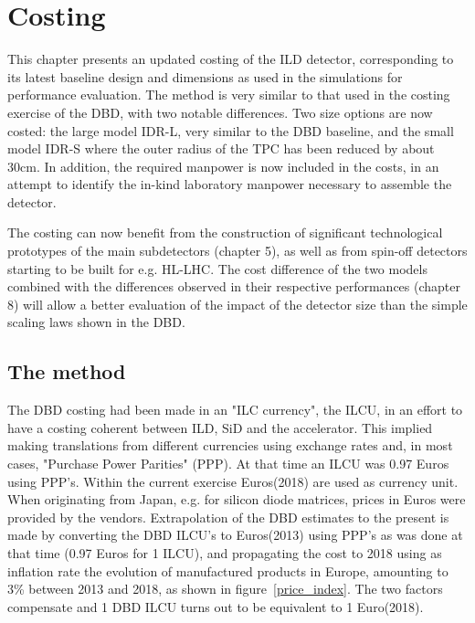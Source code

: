 \chapter{Costing}
\label{chap:costing}
This chapter presents an updated costing of the ILD detector, corresponding to its latest baseline design and dimensions as used in the simulations for performance evaluation. The method is very similar to that used in the costing exercise of the DBD, with two notable differences. Two size options are now costed: the large model IDR-L, very similar to the DBD baseline, and the small model IDR-S where the outer radius of the TPC has been reduced by about 30cm. In addition, the required manpower is now included in the costs, in an attempt to identify the in-kind laboratory manpower necessary to assemble the detector. 

The costing can now benefit from the construction of significant technological prototypes of the main subdetectors (chapter 5), as well as from spin-off detectors starting to be built for e.g. HL-LHC. The cost difference of the two models combined with the differences observed in their respective performances (chapter 8) will allow a better evaluation of the impact of the detector size than the simple scaling laws shown in the DBD. 

\section{The method}
The DBD costing had been made in an "ILC currency", the ILCU, in an effort to have a costing coherent between ILD, SiD and the accelerator. This implied making translations from different currencies using exchange rates and, in most cases, "Purchase Power Parities" (PPP). At that time an ILCU was 0.97 Euros using PPP's. Within the current exercise Euros(2018) are used as currency unit. When originating from Japan, e.g. for silicon diode matrices, prices in Euros were provided by the vendors. Extrapolation of the DBD estimates to the present is made by converting the DBD ILCU's to Euros(2013) using PPP's as was done at that time (0.97 Euros for 1 ILCU), and propagating the cost to 2018 using as inflation rate the evolution of manufactured products in Europe, amounting to 3\% between 2013 and 2018, as shown in figure~\ref{price_index}. The two factors compensate and 1 DBD ILCU turns out to be equivalent to 1 Euro(2018). 

